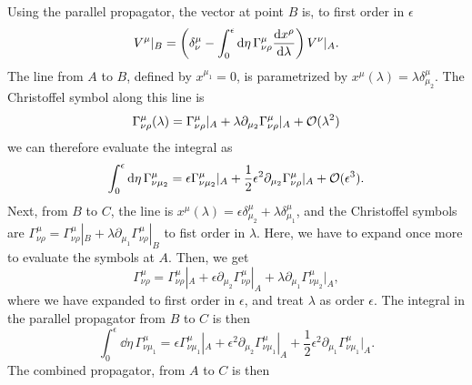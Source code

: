 Using the parallel propagator, the vector at point $B$ is, to first order in $\epsilon$
%
\begin{equation}
    V^\mu |_B = 
    \left(    
        \delta^\mu_\nu 
        - \int_0^\epsilon \dd \eta \, 
        \Gamma^\mu_{\nu \rho}  \odv{x^\rho}{\lambda} 
    \right) V^\nu|_A.
\end{equation}
%
The line from $A$ to $B$, defined by $x^{\mu_1} = 0$, is parametrized by $x^\mu(\lambda) = \lambda \delta^\mu_{\mu_2}$.
The Christoffel symbol along this line is
%
\begin{equation}
    \Gamma^{\mu}_{\nu \rho}(\lambda) 
    = \Gamma^{\mu}_{\nu \rho}|_A
    + \lambda \partial_{\mu_2} \Gamma^{\mu}_{\nu \rho}|_A + \mathcal O(\lambda^2)
\end{equation}
%
we can therefore evaluate the integral as
%
\begin{equation}
    \int_0^\epsilon \dd \eta \, \Gamma^\mu_{\nu \mu_2}
    = \epsilon \Gamma^{\mu}_{\nu \mu_2}|_A
    + \frac{1}{2} \epsilon^2 \partial_{\mu_2} \Gamma^{\mu}_{\nu \rho}|_A 
    + \mathcal O(\epsilon^3).
\end{equation}
%
Next, from $B$ to $C$, the line is $x^\mu(\lambda) = \epsilon \delta^\mu_{\mu_2} + \lambda \delta^{\mu}_{\mu_1}$, and the Christoffel symbols are 
$ 
\Gamma^{\mu}_{\nu\rho}
= 
\Gamma^{\mu}_{\nu \rho}|_B
+ \lambda \partial_{\mu_1} \Gamma^{\mu}_{\nu \rho}|_B
$
to fist order in $\lambda$.
Here, we have to expand once more to evaluate the symbols at $A$.
Then, we get
%
\begin{equation}
    \Gamma^{\mu}_{\nu\rho}
    =
    \Gamma^{\mu}_{\nu \rho}|_A + \epsilon \partial_{\mu_2} \Gamma^{\mu}_{\nu \rho}|_A
    + \lambda \partial_{\mu_1} \Gamma^{\mu}_{\nu \mu_2}|_A,
\end{equation}
%
where we have expanded to first order in $\epsilon$, and treat $\lambda$ as order $\epsilon$.
The integral in the parallel propagator from $B$ to $C$ is then
%
\begin{equation}
    \int_0^\epsilon \dd \eta \, \Gamma^\mu_{\nu \mu_1}
    = 
    \epsilon \Gamma^{\mu}_{\nu \mu_1}|_A 
    + \epsilon^2 \partial_{\mu_2} \Gamma^{\mu}_{\nu \mu_1}|_A
    + \frac{1}{2} \epsilon^2 \partial_{\mu_1} \Gamma^{\mu}_{\nu \mu_1}|_A.
\end{equation}
%
The combined propagator, from $A$ to $C$ is then
%
